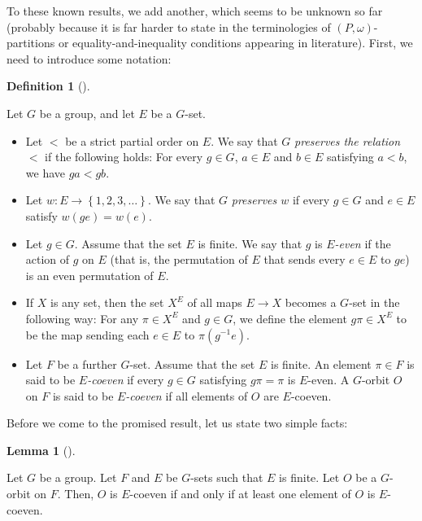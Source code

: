 \documentclass[numbers=enddot,12pt,final,onecolumn,notitlepage,abstracton]{scrartcl}
\theoremstyle{definition}
\newtheorem{lem}[theo]{Lemma}
\newenvironment{lemma}[1][]
{\begin{lem}[#1]\begin{leftbar}}
{\end{leftbar}\end{lem}}
\newtheorem{defi}[theo]{Definition}
\newenvironment{definition}[1][]
{\begin{defi}[#1]\begin{leftbar}}
{\end{leftbar}\end{defi}}
\begin{document}
To these known results, we add another, which seems to be unknown so
far (probably because it is far harder to state in the terminologies
of $\left(P, \omega\right)$-partitions or
equality-and-inequality conditions appearing in literature). First,
we need to introduce some notation:

\begin{definition}
\label{def.G-sets.terminology}
Let $G$ be a group, and let $E$ be a $G$-set.

\begin{itemize}

\item[(a)] Let $<$ be a
strict partial order on $E$. We say that $G$
\textit{preserves the relation $<$} if the following holds:
For every $g \in G$, $a \in E$ and $b \in E$ satisfying $a < b$,
we have $ga < gb$.

\item[(b)] Let $w : E \to \left\{1, 2, 3, \ldots\right\}$. We
say that $G$ \textit{preserves $w$} if every $g \in G$ and
$e \in E$ satisfy $w\left(ge\right) = w\left(e\right)$.

\item[(c)] Let $g \in G$. Assume that the set $E$ is finite.
We say that $g$ is \textit{$E$-even}
if the action of $g$ on $E$ (that is, the permutation of $E$
that sends every $e \in E$ to $ge$) is an even permutation
of $E$.

\item[(d)] If $X$ is any set, then the set $X^E$ of all maps
$E \to X$ becomes a $G$-set in the following way: For any
$\pi \in X^E$ and $g \in G$, we define the element $g\pi \in X^E$
to be the map sending each $e \in E$ to $\pi\left(g^{-1}e\right)$.

\item[(e)] Let $F$ be a further $G$-set. Assume that the set
$E$ is finite. An element $\pi \in F$
is said to be \textit{$E$-coeven} if every $g \in G$
satisfying $g\pi = \pi$ is $E$-even. A $G$-orbit $O$ on $F$ is said
to be \textit{$E$-coeven} if all elements of $O$ are $E$-coeven.

\end{itemize}
\end{definition}

Before we come to the promised result, let us state two simple facts:

\begin{lemma}
\label{lem.coeven.all-one}
Let $G$ be a group. Let $F$ and $E$ be $G$-sets such that $E$ is
finite. Let $O$ be a
$G$-orbit on $F$. Then, $O$ is $E$-coeven if and only if at least
one element of $O$ is $E$-coeven.
\end{lemma}
\end{document}

